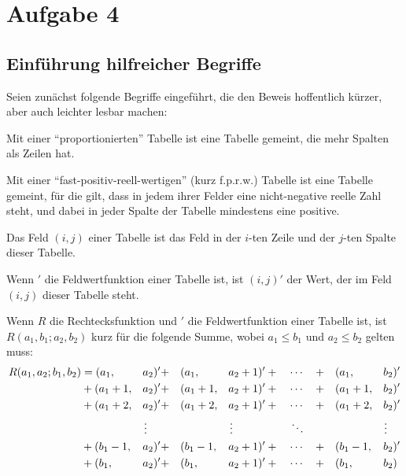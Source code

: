 \section{Aufgabe 4}

\subsection*{Einführung hilfreicher Begriffe}

Seien zunächst folgende Begriffe eingeführt, die den Beweis hoffentlich kürzer, aber auch leichter lesbar machen:
\begin{definition}
    Mit einer "`proportionierten"' Tabelle ist eine Tabelle gemeint, die mehr Spalten als Zeilen hat.
\end{definition}
\begin{definition}
    Mit einer "`fast-positiv-reell-wertigen"' (kurz f.p.r.w.) Tabelle ist eine Tabelle gemeint, für die gilt, dass 
    in jedem ihrer Felder eine nicht-negative reelle Zahl steht, und dabei in jeder Spalte der Tabelle mindestens 
    eine positive.
\end{definition}
\begin{definition}
    Das Feld $(i, j)$ einer Tabelle ist das Feld in der $i$-ten Zeile und der $j$-ten Spalte dieser Tabelle.
\end{definition}
\begin{definition}
    Wenn $'$ die Feldwertfunktion einer Tabelle ist, ist $(i, j)'$ der Wert, der im Feld $(i, j)$ dieser Tabelle 
    steht.
\end{definition}
\begin{definition}\label{rfunktion}
    Wenn $R$ die Rechtecksfunktion und $'$ die Feldwertfunktion einer Tabelle ist, ist $R(a_1, b_1; a_2, b_2)$ kurz 
    für die folgende Summe, wobei $a_1\leq b_1$ und $a_2\leq b_2$ gelten muss:
    \begin{alignat*}{6}
        R(a_1, a_2; b_1, b_2) &= (a_1, &&a_2)' + &&(a_1, &&a_2+1)' + \quad \cdots \quad + &&(a_1, &&b_2)'\\
        &+(a_1+1, &&a_2)' + &&(a_1+1, &&a_2+1)' +\quad \cdots \quad + &&(a_1+1, &&b_2)'\\
        &+(a_1+2, &&a_2)' + &&(a_1+2, &&a_2+1)' +\quad \cdots \quad + &&(a_1+2, &&b_2)'\\
        & &&\vdotswithin{a} && &&\vdotswithin{a}\quad\quad\quad\quad\quad \ddots && &&\vdotswithin{b} \\
        &+(b_1-1, &&a_2)' + &&(b_1-1, &&a_2+1)' +\quad \cdots \quad + &&(b_1-1, &&b_2)'\\
        &+(b_1, &&a_2)' + &&(b_1, &&a_2+1)' + \quad \cdots \quad + &&(b_1, &&b_2)
    \end{alignat*}    
\end{definition}
